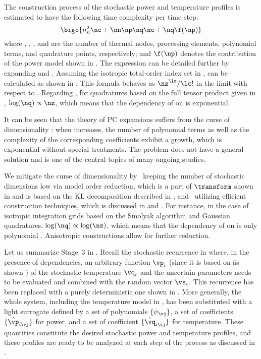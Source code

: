 The construction process of the stochastic power and temperature profiles is
estimated to have the following time complexity per time step:
\[
  \bigo{n_n^2 \nc + \nn \np \nq \nc + \nq \f(\np)}
\]
where \nn, \np, \nc, and \nq are the number of thermal nodes, processing
elements, polynomial terms, and quadrature points, respectively; and $\f(\np)$
denotes the contribution of the power model shown in .
The expression can be detailed further by expanding \nc and \nq. Assuming the
isotropic total-order index set in , \nc can
be calculated as shown in . This
formula behaves as $\nz^\lc / \lc!$ in the limit with respect to \nz. Regarding
\nq, for quadratures based on the full tensor product given in
, $\log(\nq) \propto \nz$, which means that the
dependency of \nq on \nz is exponential.

It can be seen that the theory of \ac{PC} expansions suffers from the curse of
dimensionality \cite{eldred2008, xiu2010}: when \nz increases, the number of
polynomial terms as well as the complexity of the corresponding coefficients
exhibit a growth, which is exponential without special treatments. The problem
does not have a general solution and is one of the central topics of many
ongoing studies.

We mitigate the curse of dimensionality by \one~keeping the number of stochastic
dimensions low via model order reduction, which is a part of $\transform$ shown
in  and is based on the \ac{KL} decomposition
described in , and \two~utilizing efficient
construction techniques, which is discussed in  and
. For instance, in the case of isotropic integration
grids based on the Smolyak algorithm and Gaussian quadratures, $\log(\nq)
\propto \log(\nz)$, which means that the dependency of \nq on \nz is only
polynomial \cite{heiss2008}. Anisotropic constructions allow for further
reduction.

Let us summarize Stage~3 in . Recall the stochastic
recurrence in  where, in the presence of
dependencies, an arbitrary function $\vp_i$ (since it is based on \f as shown
) of the stochastic temperature $\vq_i$ and the
uncertain parameters \vu needs to be evaluated and combined with the random
vector $\vs_i$. This recurrence has been replaced with a purely deterministic
one shown in . More generally, the whole system,
including the temperature model in , has been
substituted with a light surrogate defined by a set of polynomials $\{
\psi_{\vj} \}$, a set of coefficients $\{ \hat{\vp}_{i \vj} \}$ for power, and a
set of coefficient $\{ \hat{\vq}_{i \vj} \}$ for temperature. These quantities
constitute the desired stochastic power and temperature profiles, and these
profiles are ready to be analyzed at each step of the process as discussed in
.

